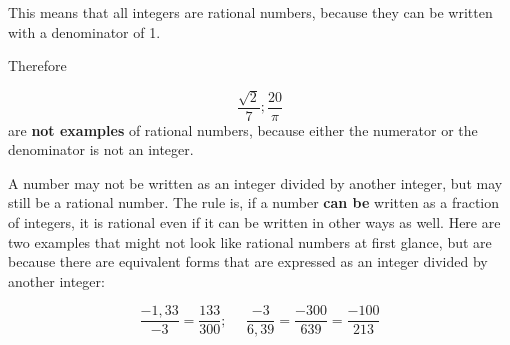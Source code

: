 % 	
	\par
      \label{m38348*id62778}This means that all integers are rational numbers, because they can be written with a denominator of 1.\par 
      \label{m38348*id62782}Therefore\par 
      \label{m38348*uid7}\nopagebreak\noindent{}
        
    \begin{equation}
    \frac{\sqrt{2}}{7} ; \frac{20}{\pi}
      \end{equation}
      \label{m38348*id62817}are \textbf{not examples} of rational numbers, because either the numerator or the denominator is not an integer.\par 
      \label{m38348*id62829}A number may not be written as an integer divided by another integer, but may still
be a rational number. The rule is, if a number \textbf{can be} written
as a fraction of integers, it is rational even if it can be written in other
ways as well. Here are two examples that might not look like rational numbers
at first glance, but are because there are equivalent forms that are expressed as an
integer divided by another integer:\par 
      \label{m38348*uid8}\nopagebreak\noindent{}
    \begin{equation}    
    \frac{-1,33}{-3}=\frac{133}{300}; ~~~~~~\frac{-3}{6,39}=\frac{-300}{639}=\frac{-100}{213}
      \end{equation}
\label{m38348*secfhsst!!!underscore!!!id232}

